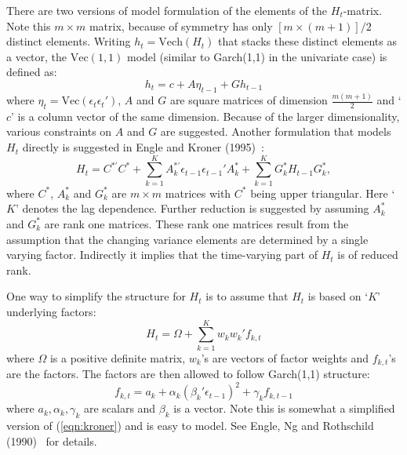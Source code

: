 There are two versions of model formulation of the elements of the $H_t$-matrix. Note this $m \times m$ matrix, because of symmetry has only $[m \times (m+1)]/2$ distinct elements. Writing $h_t=\text{Vech}(H_t)$ that stacks these distinct elements as a vector, the $\text{Vec}(1,1)$ model (similar to Garch(1,1) in the univariate case) is defined as:
	\begin{equation}\label{eqn:vecmodel}
	h_t= c + A \eta_{t-1} + G h_{t-1}
	\end{equation}
where $\eta_t=\text{Vec}(\epsilon_t \epsilon_t')$, $A$ and $G$ are square matrices of dimension $\frac{m(m+1)}{2}$ and `$c$' is a column vector of the same dimension. Because of the larger dimensionality, various constraints on $A$ and $G$ are suggested. Another formulation that models $H_t$ directly is suggested in Engle and Kroner (1995)~\cite{kroner}:
	\begin{equation}\label{eqn:kroner}
	H_t=C^{*'} C^* + \sum_{k=1}^K A_k^{*'} \epsilon_{t-1} \epsilon_{t-1}' A_k^* + \sum_{k=1}^K G_k^* H_{t-1}G_k^*,
	\end{equation}
where $C^*$, $A_k^*$ and $G_k^*$ are $m \times m$ matrices with $C^*$ being upper triangular. Here `$K$' denotes the lag dependence. Further reduction is suggested by assuming $A_k^*$ and $G_k^*$ are rank one matrices. These rank one matrices result from the assumption that the changing variance elements are determined by a single varying factor. Indirectly it implies that the time-varying part of $H_t$ is of reduced rank. 


One way to simplify the structure for $H_t$ is to assume that $H_t$ is based on `$K$' underlying factors:
	\begin{equation}\label{eqn:factorH}
	H_t= \Omega + \sum_{k=1}^K w_k w_k' f_{k,t}
	\end{equation}
where $\Omega$ is a positive definite matrix, $w_k$'s are vectors of factor weights and $f_{k,t}$'s are the factors. The factors are then allowed to follow Garch(1,1) structure:
	\begin{equation}\label{eqn:garchfactor}
	f_{k,t}= a_k + \alpha_k \left(\beta_k' \epsilon_{t-1}\right)^2 + \gamma_k f_{k,t-1}
	\end{equation}
where $a_k,\alpha_k,\gamma_k$ are scalars and $\beta_k$ is a vector. Note this is somewhat a simplified version of (\ref{eqn:kroner}) and is easy to model. See Engle, Ng and Rothschild (1990)~\cite{engleng} for details. 


